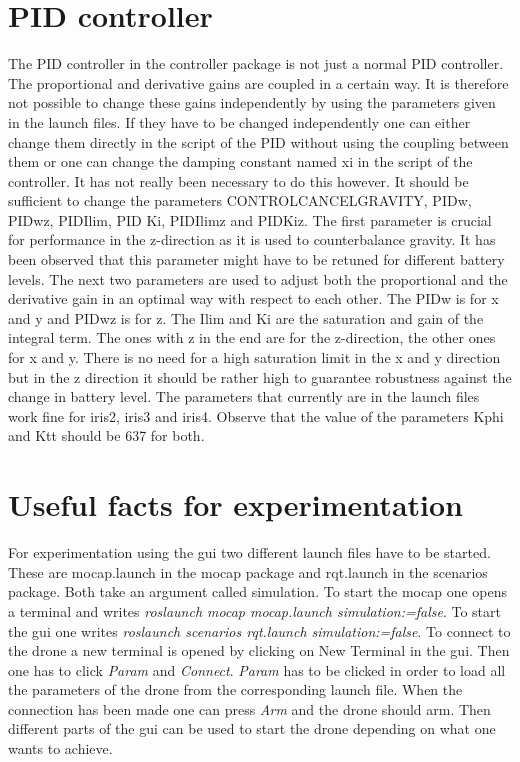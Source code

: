 \documentclass[titlepage,11pt,a4paper]{article}
\begin{document}
\section{PID controller}
The PID controller in the controller package is not just a normal PID controller. The proportional and derivative gains are coupled in a certain way. It is therefore not possible to change these gains independently by using the parameters given in the launch files. If they have to be changed independently one can either change them directly in the script of the PID without using the coupling between them or one can change the damping constant named x\textunderscore i in the script of the controller. It has not really been necessary to do this however.
It should be sufficient to change the parameters CONTROL\textunderscore CANCEL\textunderscore GRAVITY, PID\textunderscore w, PID\textunderscore w\textunderscore z, PID\textunderscore I\textunderscore lim, PID \textunderscore K\textunderscore i, PID\textunderscore I\textunderscore lim\textunderscore z and PID\textunderscore K\textunderscore i\textunderscore z. The first parameter is crucial for performance in the z-direction as it is used to counterbalance gravity. It has been observed that this parameter might have to be retuned for different battery levels. The next two parameters are used to adjust both the proportional and the derivative gain in an optimal way with respect to each other. The PID\textunderscore w is for x and y and PID\textunderscore w\textunderscore z is for z. The I\textunderscore lim and K\textunderscore i are the saturation and gain of the integral term. The ones with \textunderscore z in the end are for the z-direction, the other ones for x and y. There is no need for a high saturation limit in the x and y direction but in the z direction it should be rather high to guarantee robustness against the change in battery level. The parameters that currently are in the launch files work fine for iris2, iris3 and iris4.
Observe that the value of the parameters Kphi and Ktt should be 637 for both. 

\section{Useful facts for experimentation}
For experimentation using the gui two different launch files have to be started. These are mocap.launch in the mocap package and rqt.launch in the scenarios package. Both take an argument called simulation. To start the mocap one opens a terminal and writes \textit{roslaunch mocap mocap.launch simulation:=false}. To start the gui one writes \textit{roslaunch scenarios rqt.launch simulation:=false}. To connect to the drone a new terminal is opened by clicking on New Terminal in the gui. Then one has to click \textit{Param} and \textit{Connect}. \textit{Param} has to be clicked in order to load all the parameters of the drone from the corresponding launch file. When the connection has been made one can press \textit{Arm} and the drone should arm. Then different parts of the gui can be used to start the drone depending on what one wants to achieve.
\end{document}
